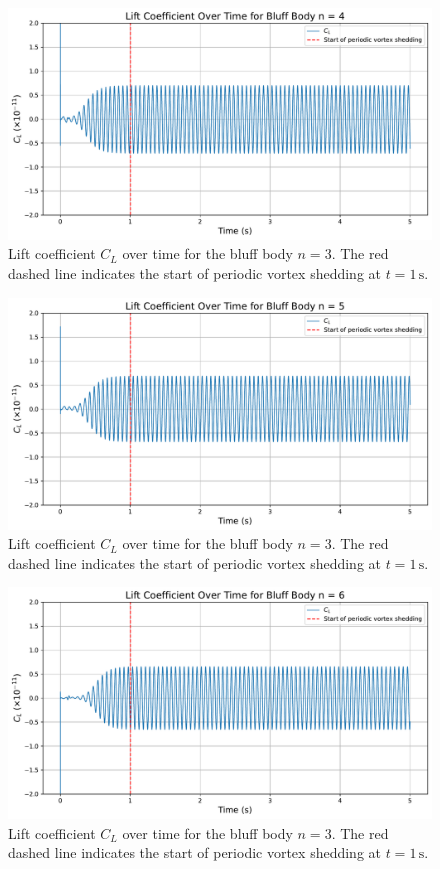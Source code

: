 \begin{figure}[H]
	\centering
	\includegraphics[width=\textwidth]{images/4face_graph}
	\caption{Lift coefficient $C_L$ over time for the bluff body $n=3$. The red dashed line indicates the start of periodic vortex shedding at $t = 1\,\mathrm{s}$.}
	\label{fig:4FaceGraph} 
\end{figure}

\begin{figure}[H]
	\centering
	\includegraphics[width=\textwidth]{images/5face_graph}
	\caption{Lift coefficient $C_L$ over time for the bluff body $n=3$. The red dashed line indicates the start of periodic vortex shedding at $t = 1\,\mathrm{s}$.}
	\label{fig:5FaceGraph} 
\end{figure}

\begin{figure}[H]
	\centering
	\includegraphics[width=\textwidth]{images/6face_graph}
	\caption{Lift coefficient $C_L$ over time for the bluff body $n=3$. The red dashed line indicates the start of periodic vortex shedding at $t = 1\,\mathrm{s}$.}
	\label{fig:6FaceGraph} 
\end{figure}

